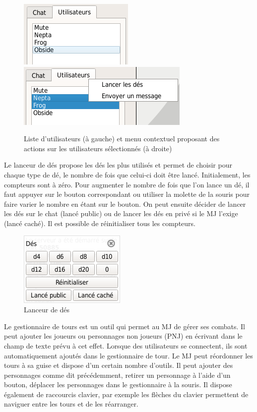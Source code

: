 \begin{figure}[h!]
	\centering
	\includegraphics[scale=0.5]{img/chat_userlist_1.png}
	\hspace{10 mm}
	\includegraphics[scale=0.5]{img/chat_userlist_2.png}
	\caption{Liste d'utilisateurs (à gauche) et menu contextuel proposant des actions sur les utilisateurs sélectionnés (à droite)}
\end{figure}

Le lanceur de dés propose les dés les plus utilisés et permet de choisir pour chaque type de dé, le nombre de fois que celui-ci doit être lancé. Initialement, les compteurs sont à zéro. Pour augmenter le nombre de fois que l'on lance un dé, il faut appuyer sur le bouton correspondant ou utiliser la molette de la souris pour faire varier le nombre en étant sur le bouton. On peut ensuite décider de lancer les dés sur le chat (lancé public) ou de lancer les dés en privé si le MJ l'exige (lancé caché). Il est possible de réinitialiser tous les compteurs.

\begin{figure}[h!]
	\centering
	\includegraphics[scale=0.5]{img/dice_manager.png}
	\caption{Lanceur de dés}
\end{figure}

Le gestionnaire de tours est un outil qui permet au MJ de gérer ses combats. Il peut ajouter les joueurs ou personnages non joueurs (PNJ) en écrivant dans le champ de texte prévu à cet effet. Lorsque des utilisateurs se connectent, ils sont automatiquement ajoutés dans le gestionnaire de tour. Le MJ peut réordonner les tours à sa guise et dispose d'un certain nombre d'outils. Il peut ajouter des personnages comme dit précédemment, retirer un personnage à l'aide d'un bouton, déplacer les personnages dans le gestionnaire à la souris. Il dispose également de raccourcis clavier, par exemple les flèches du clavier permettent de naviguer entre les tours et de les réarranger.

